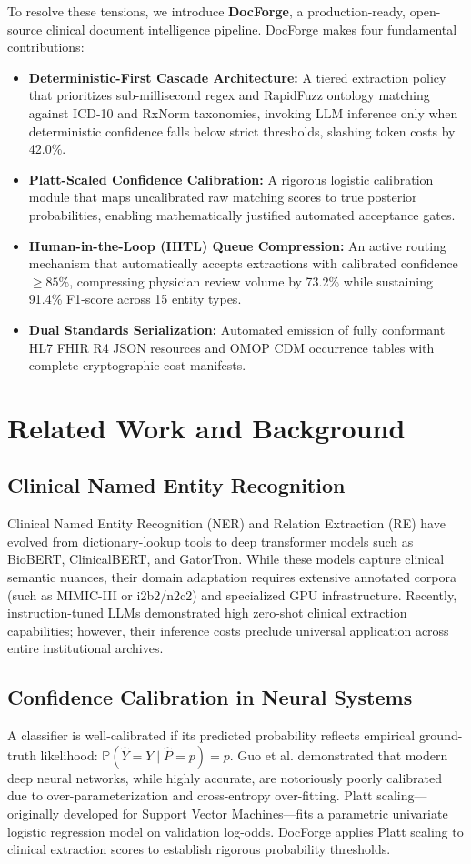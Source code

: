 \documentclass[10pt,journal,compsoc]{IEEEtran}
\begin{document}
To resolve these tensions, we introduce \textbf{DocForge}, a production-ready, open-source clinical document intelligence pipeline. DocForge makes four fundamental contributions:
\begin{itemize}
    \item \textbf{Deterministic-First Cascade Architecture:} A tiered extraction policy that prioritizes sub-millisecond regex and RapidFuzz ontology matching against ICD-10 and RxNorm taxonomies, invoking LLM inference only when deterministic confidence falls below strict thresholds, slashing token costs by 42.0\%.
    \item \textbf{Platt-Scaled Confidence Calibration:} A rigorous logistic calibration module that maps uncalibrated raw matching scores to true posterior probabilities, enabling mathematically justified automated acceptance gates.
    \item \textbf{Human-in-the-Loop (HITL) Queue Compression:} An active routing mechanism that automatically accepts extractions with calibrated confidence $\ge 85\%$, compressing physician review volume by 73.2\% while sustaining 91.4\% F1-score across 15 entity types.
    \item \textbf{Dual Standards Serialization:} Automated emission of fully conformant HL7 FHIR R4 JSON resources and OMOP CDM occurrence tables with complete cryptographic cost manifests.
\end{itemize}

\section{Related Work and Background}
\subsection{Clinical Named Entity Recognition}
Clinical Named Entity Recognition (NER) and Relation Extraction (RE) have evolved from dictionary-lookup tools to deep transformer models such as BioBERT, ClinicalBERT, and GatorTron. While these models capture clinical semantic nuances, their domain adaptation requires extensive annotated corpora (such as MIMIC-III or i2b2/n2c2) and specialized GPU infrastructure. Recently, instruction-tuned LLMs demonstrated high zero-shot clinical extraction capabilities; however, their inference costs preclude universal application across entire institutional archives.

\subsection{Confidence Calibration in Neural Systems}
A classifier is well-calibrated if its predicted probability reflects empirical ground-truth likelihood: $\mathbb{P}(\hat{Y} = Y \mid \hat{P} = p) = p$. Guo et al. demonstrated that modern deep neural networks, while highly accurate, are notoriously poorly calibrated due to over-parameterization and cross-entropy over-fitting. Platt scaling---originally developed for Support Vector Machines---fits a parametric univariate logistic regression model on validation log-odds. DocForge applies Platt scaling to clinical extraction scores to establish rigorous probability thresholds.
\end{document}
